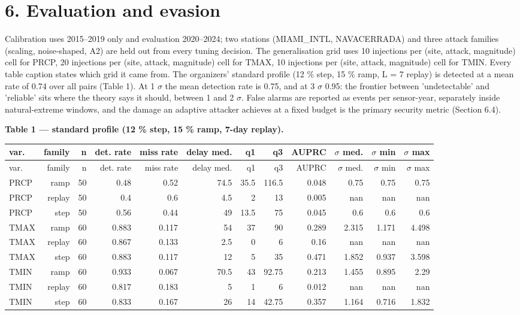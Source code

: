 \documentclass[10pt,a4paper]{article}
\begin{document}
\section*{6. Evaluation and evasion}
Calibration uses 2015–2019 only and evaluation 2020–2024; two stations (MIAMI\_\allowbreak{}INTL, NAVACERRADA) and three attack families (scaling, noise-\allowbreak{}shaped, A2) are held out from every tuning decision. The generalisation grid uses 10 injections per (site, attack, magnitude) cell for PRCP, 20 injections per (site, attack, magnitude) cell for TMAX, 10 injections per (site, attack, magnitude) cell for TMIN. Every table caption states which grid it came from. The organizers' standard profile (12 \% step, 15 \% ramp, L = 7 replay) is detected at a mean rate of 0.74 over all pairs (Table 1). At 1 $\sigma$ the mean detection rate is 0.75, and at 3 $\sigma$ 0.95: the frontier between 'undetectable' and 'reliable' sits where the theory says it should, between 1 and 2 $\sigma$. False alarms are reported as events per sensor-\allowbreak{}year, separately inside natural-\allowbreak{}extreme windows, and the damage an adaptive attacker achieves at a fixed budget is the primary security metric (Section 6.4).

\textbf{Table 1 — standard profile (12 \% step, 15 \% ramp, 7-\allowbreak{}day replay).}

{\small
\setlength{\tabcolsep}{2pt}
\setlength{\LTleft}{\fill}
\setlength{\LTright}{\fill}
\begin{longtable}{lrrrrrrrrrrr}
\toprule
var. & family & n & det. rate & miss rate & delay med. & q1 & q3 & AUPRC & $\sigma$ med. & $\sigma$ min & $\sigma$ max \\
\midrule
\endfirsthead
\toprule
var. & family & n & det. rate & miss rate & delay med. & q1 & q3 & AUPRC & $\sigma$ med. & $\sigma$ min & $\sigma$ max \\
\midrule
\endhead
\bottomrule
\endlastfoot
PRCP & ramp & 50 & 0.48 & 0.52 & 74.5 & 35.5 & 116.5 & 0.048 & 0.75 & 0.75 & 0.75 \\
PRCP & replay & 50 & 0.4 & 0.6 & 4.5 & 2 & 13 & 0.005 & nan & nan & nan \\
PRCP & step & 50 & 0.56 & 0.44 & 49 & 13.5 & 75 & 0.045 & 0.6 & 0.6 & 0.6 \\
TMAX & ramp & 60 & 0.883 & 0.117 & 54 & 37 & 90 & 0.289 & 2.315 & 1.171 & 4.498 \\
TMAX & replay & 60 & 0.867 & 0.133 & 2.5 & 0 & 6 & 0.16 & nan & nan & nan \\
TMAX & step & 60 & 0.883 & 0.117 & 12 & 5 & 35 & 0.471 & 1.852 & 0.937 & 3.598 \\
TMIN & ramp & 60 & 0.933 & 0.067 & 70.5 & 43 & 92.75 & 0.213 & 1.455 & 0.895 & 2.29 \\
TMIN & replay & 60 & 0.817 & 0.183 & 5 & 1 & 6 & 0.012 & nan & nan & nan \\
TMIN & step & 60 & 0.833 & 0.167 & 26 & 14 & 42.75 & 0.357 & 1.164 & 0.716 & 1.832 \\
\end{longtable}
}
\end{document}
